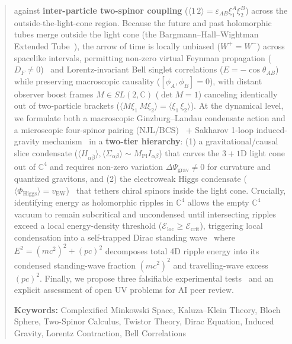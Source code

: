 \documentclass[11pt,a4paper]{article}
\begin{document}
\begin{abstract}
against \textbf{inter-particle two-spinor coupling} ($\langle 1\,2\rangle = \varepsilon_{AB}\xi_1^A\xi_2^B$) across the outside-the-light-cone region. Because the future and past holomorphic tubes merge outside the light cone (the Bargmann--Hall--Wightman Extended Tube~\cite{StreaterWightman1964}), the arrow of time is locally unbiased ($W^+ = W^-$) across spacelike intervals, permitting non-zero virtual Feynman propagation ($D_F \neq 0$)~\cite{Feynman1949} and Lorentz-invariant Bell singlet correlations ($E = -\cos\theta_{AB}$)~\cite{Bell1964,Tsirelson1980} while preserving macroscopic causality ($[\phi_A, \phi_B] = 0$), with distant observer boost frames $M \in SL(2,\mathbb{C})$ ($\det M = 1$) canceling identically out of two-particle brackets ($\langle M\xi_1 \, M\xi_2 \rangle = \langle \xi_1 \, \xi_2 \rangle$). At the dynamical level, we formulate both a macroscopic Ginzburg--Landau condensate action and a microscopic four-spinor pairing (NJL/BCS)~\cite{NJL1961} + Sakharov 1-loop induced-gravity mechanism~\cite{Sakharov1967} in a \textbf{two-tier hierarchy}: (1) a gravitational/causal slice condensate ($\langle H_{\alpha\bar{\beta}}\rangle, \langle\Sigma_{\alpha\beta}\rangle \sim M_{\text{Pl}}I_{\alpha\beta}$) that carves the $3+1\text{D}$ light cone out of $\mathbb{C}^4$ and requires non-zero variation $\Delta\Psi_{\text{grav}} \neq 0$ for curvature and quantized gravitons, and (2) the electroweak Higgs condensate ($\langle\Phi_{\text{Higgs}}\rangle = v_{\text{EW}}$)~\cite{Higgs1964} that tethers chiral spinors inside the light cone. Crucially, identifying energy as holomorphic ripples in $\mathbb{C}^4$ allows the empty $\mathbb{C}^4$ vacuum to remain subcritical and uncondensed until intersecting ripples exceed a local energy-density threshold ($\mathcal{E}_{\text{loc}} \ge \mathcal{E}_{\text{crit}}$), triggering local condensation into a self-trapped Dirac standing wave~\cite{Dirac1928,Wheeler1955} where $E^2 = (mc^2)^2 + (pc)^2$ decomposes total 4D ripple energy into its condensed standing-wave fraction $(mc^2)^2$ and travelling-wave excess $(pc)^2$. Finally, we propose three falsifiable experimental tests~\cite{HeisenbergEuler1936,Vasileiou2013} and an explicit assessment of open UV problems for AI peer review.

\vspace{0.5em}
\noindent\textbf{Keywords:} Complexified Minkowski Space, Kaluza--Klein Theory, Bloch Sphere, Two-Spinor Calculus, Twistor Theory, Dirac Equation, Induced Gravity, Lorentz Contraction, Bell Correlations
\end{abstract}
\end{document}
